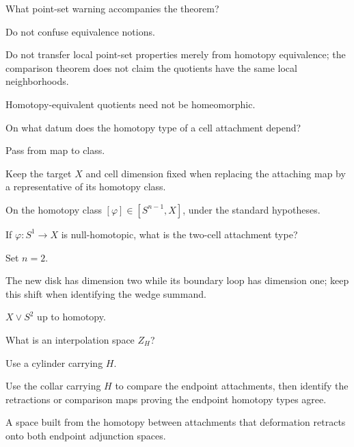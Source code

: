 \begin{exercise}\label{exr:viii08-14}
What point-set warning accompanies the theorem?
\end{exercise}
\begin{hint}
Do not confuse equivalence notions.

Do not transfer local point-set properties merely from homotopy equivalence; the comparison theorem does not claim the quotients have the same local neighborhoods.
\end{hint}
\begin{solution}
Homotopy-equivalent quotients need not be homeomorphic.
\end{solution}

\begin{exercise}\label{exr:viii08-15}
On what datum does the homotopy type of a cell attachment depend?
\end{exercise}
\begin{hint}
Pass from map to class.

Keep the target \(X\) and cell dimension fixed when replacing the attaching map by a representative of its homotopy class.
\end{hint}
\begin{solution}
On the homotopy class \([\varphi]\in[S^{n-1},X]\), under the standard hypotheses.
\end{solution}

\begin{exercise}\label{exr:viii08-16}
If \(\varphi:S^1\to X\) is null-homotopic, what is the two-cell attachment type?
\end{exercise}
\begin{hint}
Set \(n=2\).

The new disk has dimension two while its boundary loop has dimension one; keep this shift when identifying the wedge summand.
\end{hint}
\begin{solution}
\(X\vee S^2\) up to homotopy.
\end{solution}

\begin{exercise}\label{exr:viii08-17}
What is an interpolation space \(Z_H\)?
\end{exercise}
\begin{hint}
Use a cylinder carrying \(H\).

Use the collar carrying \(H\) to compare the endpoint attachments, then identify the retractions or comparison maps proving the endpoint homotopy types agree.
\end{hint}
\begin{solution}
A space built from the homotopy between attachments that deformation retracts onto both endpoint adjunction spaces.
\end{solution}

